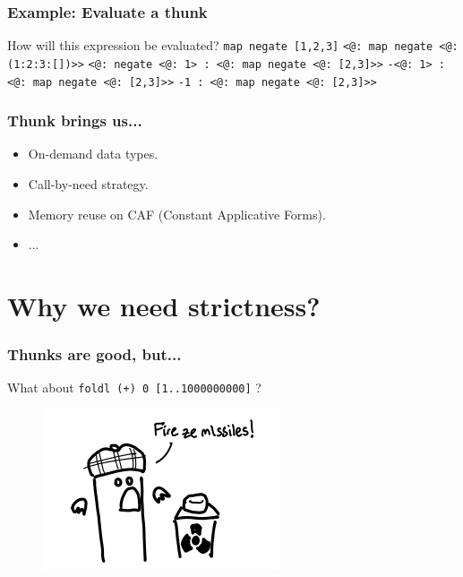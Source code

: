 \documentclass{beamer}
\begin{document}

\begin{frame}
\frametitle{Example: Evaluate a thunk}
How will this expression be evaluated?\newline\bigskip
\texttt{map negate [1,2,3]}\newline\bigskip\pause
\texttt{<@: map negate <@: (1:2:3:[])>>}\newline\bigskip\pause
\texttt{<@: negate <@: 1> : <@: map negate <@: [2,3]>>}\newline\bigskip\pause
\texttt{-<@: 1> : <@: map negate <@: [2,3]>>}\newline\bigskip\pause
\texttt{-1 : <@: map negate <@: [2,3]>>}
\end{frame}


\begin{frame}
\frametitle{Thunk brings us...}
\begin{itemize}
    \item On-demand data types.
    \item Call-by-need strategy.
    \item Memory reuse on CAF (Constant Applicative Forms).
    \item ...
\end{itemize}\bigskip
{}
\end{frame}


\section{Why we need strictness?}

\begin{frame}
\frametitle{Thunks are good, but...}
\bigskip
What about \texttt{foldl (+) 0 [1..1000000000]} ?\newline
\begin{figure}[hbt!]
    \centering
    \includegraphics[height=0.4\textheight]{./pic/evil-of-thunk.png}
\end{figure}
\end{frame}
\end{document}
